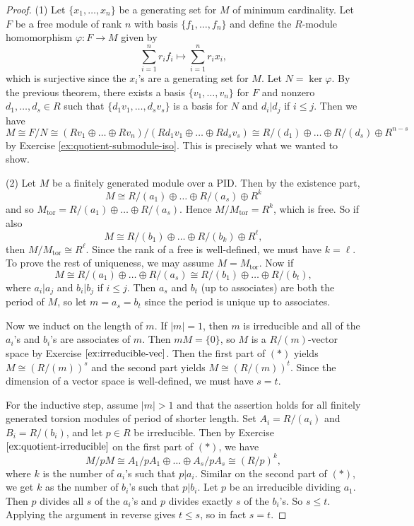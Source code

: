 \begin{proof}
  (1) Let $\{x_1, \dots, x_n\}$ be a generating set for
  $M$ of minimum cardinality. Let $F$ be a free module of
  rank $n$ with basis $\{f_1, \dots, f_n\}$ and
  define the $R$-module homomorphism $\varphi : F \to M$
  given by
  \[
    \sum_{i = 1}^n r_i f_i \mapsto \sum_{i = 1}^n r_i x_i,
  \]
  which is surjective since the $x_i$'s are a generating
  set for $M$. Let $N = \ker \varphi$. By the previous
  theorem, there exists a basis $\{v_1, \dots, v_n\}$
  for $F$ and nonzero $d_1, \dots, d_s \in R$ such that
  $\{d_1 v_1, \dots, d_s v_s\}$ is a basis for $N$ and
  $d_i | d_j$ if $i \le j$. Then we have
  \[
    M \cong F / N \cong (Rv_1 \oplus \dots \oplus Rv_n) / (Rd_1 v_1 \oplus \dots \oplus Rd_s v_s)
    \cong R / (d_1) \oplus \dots \oplus R / (d_s) \oplus R^{n - s}
  \]
  by Exercise \ref{ex:quotient-submodule-iso}.
  This is precisely what we wanted to show.

  (2) Let $M$ be a finitely generated module over a PID.
  Then by the existence part,
  \[
    M \cong R / (a_1) \oplus \dots \oplus R / (a_s) \oplus R^k
  \]
  and so $M_{\mathrm{tor}} = R / (a_1) \oplus \dots \oplus R / (a_s)$.
  Hence $M / M_{\mathrm{tor}} = R^k$, which is free. So
  if also
  \[
    M \cong R / (b_1) \oplus \dots \oplus R / (b_k) \oplus R^\ell,
  \]
  then $M / M_{\mathrm{tor}} \cong R^\ell$. Since the
  rank of a free is well-defined, we must have $k = \ell$.
  To prove the rest of uniqueness, we may assume
  $M = M_{\mathrm{tor}}$. Now if
  \[
    M \cong R / (a_1) \oplus \dots \oplus R / (a_s)
    \cong R / (b_1) \oplus \dots \oplus R / (b_t), \tag{*}
  \]
  where $a_i | a_j$ and $b_i | b_j$ if $i \le j$. Then
  $a_s$ and $b_t$ (up to associates) are both the period of $M$, so
  let $m = a_s = b_t$ since the period is unique up
  to associates.

  Now we induct on the length of
  $m$. If $|m| = 1$, then $m$ is irreducible and all of
  the $a_i$'s and $b_i$'s are associates of $m$. Then
  $mM = \{0\}$, so $M$ is a $R / (m)$-vector space by
  Exercise $\ref{ex:irreducible-vec}$. Then the first part
  of $(*)$ yields $M \cong (R / (m))^s$ and the second
  part yields $M \cong (R / (m))^t$. Since the dimension
  of a vector space is well-defined, we must have
  $s = t$.

  For the inductive step, assume $|m| > 1$ and that
  the assertion holds for all finitely generated
  torsion modules of period of shorter length.
  Set $A_i = R / (a_i)$ and $B_i = R / (b_i)$, and
  let $p \in R$ be irreducible.
  Then by Exercise $\ref{ex:quotient-irreducible}$ on
  the first part of $(*)$, we have
  \[
    M / pM \cong A_1 / pA_1 \oplus \dots \oplus A_s / pA_s
    \cong (R / p)^k,
  \]
  where $k$ is the number of $a_i$'s such that $p | a_i$.
  Similar on the second part of $(*)$, we get
  $k$ as the number of $b_i$'s such that $p | b_i$.
  Let $p$ be an irreducible dividing $a_1$. Then $p$
  divides all $s$ of the $a_i$'s and $p$ divides exactly
  $s$ of the $b_i$'s. So $s \le t$. Applying the
  argument in reverse gives $t \le s$, so in fact
  $s = t$.


\end{proof}
